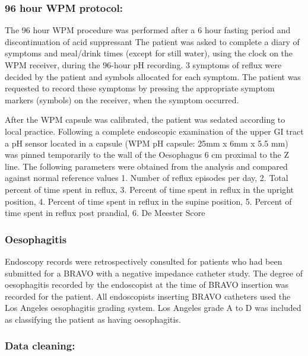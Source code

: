 \documentclass[english,man,floatsintext]{apa6}
\begin{document}
\hypertarget{hour-wpm-protocol}{%
\subsubsection{96 hour WPM protocol:}\label{hour-wpm-protocol}}

The 96 hour WPM procedure was performed after a 6 hour fasting period and discontinuation of acid suppressant The patient was asked to complete a diary of symptoms and meal/drink times (except for still water), using the clock on the WPM receiver, during the 96-hour pH recording. 3 symptoms of reflux were decided by the patient and symbols allocated for each symptom. The patient was requested to record these symptoms by pressing the appropriate symptom markers (symbols) on the receiver, when the symptom occurred.

After the WPM capsule was calibrated, the patient was sedated according to local practice. Following a complete endoscopic examination of the upper GI tract a pH sensor located in a capsule (WPM pH capsule: 25mm x 6mm x 5.5 mm) was pinned temporarily to the wall of the Oesophagus 6 cm proximal to the Z line.
The following parameters were obtained from the analysis and compared against normal reference values 1. Number of reflux episodes per day, 2. Total percent of time spent in reflux, 3. Percent of time spent in reflux in the upright position, 4. Percent of time spent in reflux in the supine position, 5. Percent of time spent in reflux post prandial, 6. De Meester Score

\hypertarget{oesophagitis}{%
\subsubsection{Oesophagitis}\label{oesophagitis}}

Endoscopy records were retrospectively consulted for patients who had been submitted for a BRAVO with a negative impedance catheter study. The degree of oesophagitis recorded by the endoscopist at the time of BRAVO insertion was recorded for the patient. All endoscopists inserting BRAVO catheters used the Los Angeles oesophagitis grading system. Los Angeles grade A to D was included as classifying the patient as having oesophagitis.

\hypertarget{data-cleaning}{%
\subsubsection{Data cleaning:}\label{data-cleaning}}
\end{document}
